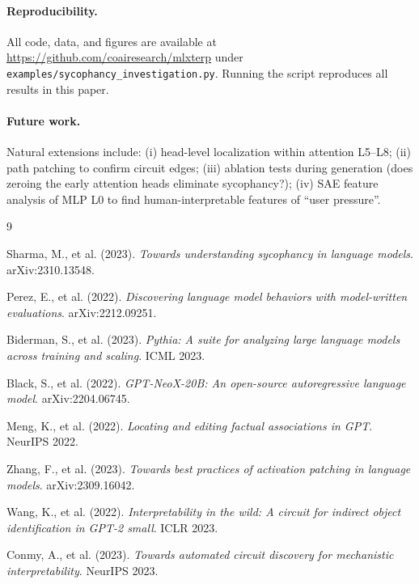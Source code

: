 \documentclass[10pt,letterpaper]{article}
\begin{document}
\paragraph{Reproducibility.} All code, data, and figures are available at \url{https://github.com/coairesearch/mlxterp} under \texttt{examples/sycophancy\_investigation.py}. Running the script reproduces all results in this paper.

\paragraph{Future work.} Natural extensions include: (i) head-level localization within attention L5--L8; (ii) path patching to confirm circuit edges; (iii) ablation tests during generation (does zeroing the early attention heads eliminate sycophancy?); (iv) SAE feature analysis of MLP L0 to find human-interpretable features of ``user pressure''.

\begin{thebibliography}{9}

Sharma, M., et al. (2023).
\textit{Towards understanding sycophancy in language models}.
arXiv:2310.13548.

Perez, E., et al. (2022).
\textit{Discovering language model behaviors with model-written evaluations}.
arXiv:2212.09251.

Biderman, S., et al. (2023).
\textit{Pythia: A suite for analyzing large language models across training and scaling}.
ICML 2023.

Black, S., et al. (2022).
\textit{GPT-NeoX-20B: An open-source autoregressive language model}.
arXiv:2204.06745.

Meng, K., et al. (2022).
\textit{Locating and editing factual associations in GPT}.
NeurIPS 2022.

Zhang, F., et al. (2023).
\textit{Towards best practices of activation patching in language models}.
arXiv:2309.16042.

Wang, K., et al. (2022).
\textit{Interpretability in the wild: A circuit for indirect object identification in GPT-2 small}.
ICLR 2023.

Conmy, A., et al. (2023).
\textit{Towards automated circuit discovery for mechanistic interpretability}.
NeurIPS 2023.

\end{thebibliography}
\end{document}
